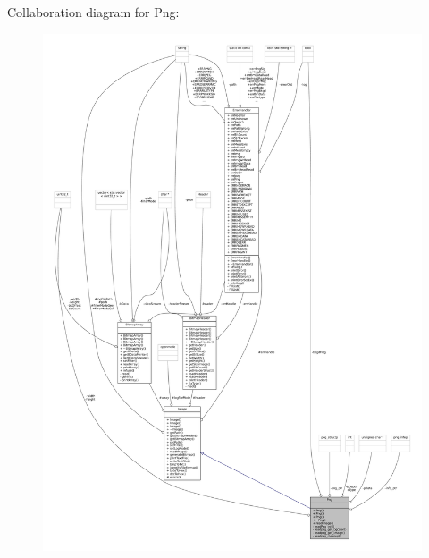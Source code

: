 Collaboration diagram for Png\+:
\nopagebreak
\begin{figure}[H]
\begin{center}
\leavevmode
\includegraphics[width=350pt]{classPng__coll__graph}
\end{center}
\end{figure}
